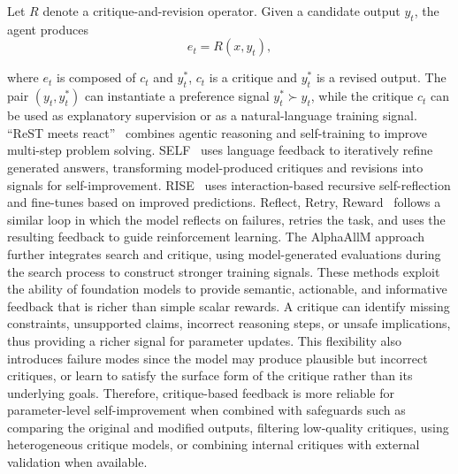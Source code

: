 Let $R$ denote a critique-and-revision operator. Given a candidate output $y_t$, the agent produces
\begin{equation}
e_t=R(x,y_t), 
\end{equation}


where $e_t$ is composed of $c_t$ and $y_t^\ast$, $c_t$ is a critique and $y_t^\ast$ is a revised output. The pair $(y_t,y_t^\ast)$ can instantiate a preference signal $y_t^\ast \succ y_t$, while the critique $c_t$ can be used as explanatory supervision or as a natural-language training signal. ``ReST meets react''~\citep{aksitov2023rest} combines agentic reasoning and self-training to improve multi-step problem solving. SELF~\citep{lu2023self} uses language feedback to iteratively refine generated answers, transforming model-produced critiques and revisions into signals for self-improvement. RISE~\citep{qu2024recursive} uses interaction-based recursive self-reflection and fine-tunes based on improved predictions. Reflect, Retry, Reward~\citep{bensal2025reflect} follows a similar loop in which the model reflects on failures, retries the task, and uses the resulting feedback to guide reinforcement learning. The AlphaAllM approach~\citep{tian2024toward} further integrates search and critique, using model-generated evaluations during the search process to construct stronger training signals. These methods exploit the ability of foundation models to  provide semantic, actionable, and informative feedback that is richer than simple scalar rewards. A critique can identify missing constraints, unsupported claims, incorrect reasoning steps, or unsafe implications, thus providing a richer signal for parameter updates. This flexibility also introduces failure modes since the model may produce plausible but incorrect critiques, or learn to satisfy the surface form of the critique rather than its underlying goals.  Therefore, critique-based feedback is more reliable for parameter-level self-improvement when combined with safeguards such as comparing the original and modified outputs, filtering low-quality critiques, using heterogeneous critique models, or combining internal critiques with external validation when available.

